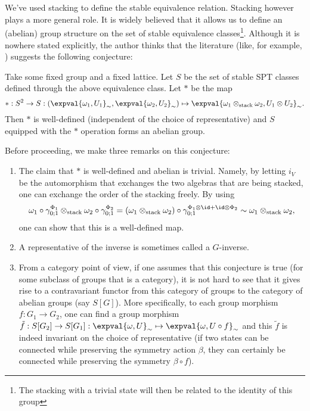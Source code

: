 \\\\
We've used stacking to define the stable equivalence relation. Stacking however plays a more general role. It is widely believed that it allows us to define an (abelian) group structure on the set of stable equivalence classes\footnote{The stacking with a trivial state will then be related to the identity of this group}. Although it is nowhere stated explicitly, the author thinks that the literature (like, for example, \cite{kapustin2021classification}) suggests the following conjecture:
\begin{conjecture}\label{conj:StableEquivGroupStructure}
	Take some fixed group and a fixed lattice. Let $S$ be the set of stable SPT classes defined through the above equivalence class. Let $*$ be the map
	\begin{equation}
		*:S^2\rightarrow S:(\expval{\omega_1,U_1}_{\sim},\expval{\omega_2,U_2}_{\sim})\mapsto \expval{\omega_1\otimes_\text{stack}\omega_2,U_1\otimes U_2}_{\sim}.
	\end{equation}
	Then $*$ is well-defined (independent of the choice of representative) and $S$ equipped with the $*$ operation forms an abelian group.
\end{conjecture}
Before proceeding, we make three remarks on this conjecture:
\begin{enumerate}
	\item The claim that $*$ is well-defined and abelian is trivial. Namely, by letting $i_V$ be the automorphism that exchanges the two algebras that are being stacked, one can exchange the order of the stacking freely. By using
	\begin{equation}
		\omega_1\circ\gamma^{\Phi_1}_{0;1}\otimes_\text{stack}\omega_2\circ\gamma^{\Phi_2}_{0;1}=(\omega_1\otimes_{\text{stack}}\omega_2)\circ\gamma^{\Phi_1\otimes\id+\id\otimes\Phi_2}_{0;1}\sim\omega_1\otimes_{\text{stack}}\omega_2,
	\end{equation}
	one can show that this is a well-defined map.
	\item A representative of the inverse is sometimes called a $G$-inverse.
	\item From a category point of view, if one assumes that this conjecture is true (for some subclass of groups that is a category), it is not hard to see that it gives rise to a contravariant functor from this category of groups to the category of abelian groups (say $S[G]$). More specifically, to each group morphism $f:G_1\rightarrow G_2$, one can find a group morphism $\tilde{f}:S[G_2]\rightarrow S[G_1]:\expval{\omega,U}_\sim\mapsto \expval{\omega,U\circ f}_\sim$ and this $\tilde{f}$ is indeed invariant on the choice of representative (if two states can be connected while preserving the symmetry action $\beta$, they can certainly be connected while preserving the symmetry $\beta\circ f$).
\end{enumerate}

